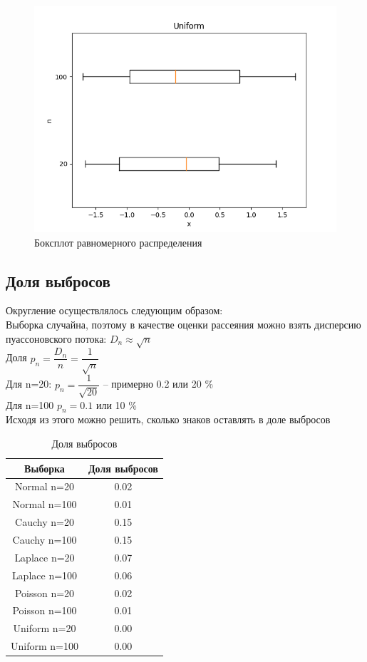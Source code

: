 \begin{figure}[H]
	\centering
	\includegraphics[scale=0.65]{uniform_boxplot.png}
	\caption{Боксплот равномерного распределения}
\end{figure}

\subsection{Доля выбросов}

Округление осуществлялось следующим образом: \\
Выборка случайна, поэтому в качестве оценки рассеяния можно взять дисперсию пуассоновского потока: $D_{n} \approx \sqrt{n}$ \\
Доля $p_n = \dfrac{D_n}{n}=\dfrac{1}{\sqrt{n}} $ \\
Для n=20: $p_n = \dfrac{1}{\sqrt{20}}$ -- примерно 0.2 или 20 \% \\
Для n=100 $p_n = 0.1$ или 10 \% \\
Исходя из этого можно решить, сколько знаков оставлять в доле выбросов\\
\begin{table}[H]
	\begin{center}
		\begin{tabular}{|c|c|}
			\hline
			Выборка & Доля выбросов \\
			\hline\hline
			Normal n=20 & 0.02\\
			\hline 
			Normal n=100 & 0.01\\
			\hline
			Cauchy n=20 & 0.15\\
			\hline 
			Cauchy n=100 & 0.15\\
			\hline
			Laplace n=20 & 0.07\\
			\hline 
			Laplace n=100 & 0.06\\
			\hline
			Poisson n=20 & 0.02\\
			\hline 
			Poisson n=100 & 0.01\\
			\hline
			Uniform n=20 & 0.00\\
			\hline 
			Uniform n=100 & 0.00\\
			\hline
		\end{tabular}
	\end{center}
    \caption{Доля выбросов}
\end{table}




